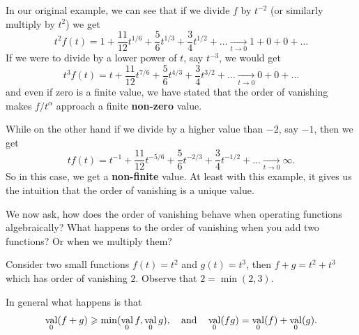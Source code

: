 \documentclass[12pt]{memoir}
\DeclareMathOperator{\val}{val}
\begin{document}
\begin{Ex}
    In our original example, we can see that if we divide $f$ by $t^{-2}$ (or similarly multiply by $t^2$) we get 
$$t^2f(t) = 1 + \frac{11}{12}t^{1/6} + \frac{5}{6}t^{1/3} + \frac{3}{4}t^{1/2} + \dots \xrightarrow[t\to0]{} 1 + 0 + 0 + \dots$$
If we were to divide by a lower power of $t$, say $t^{-3}$, we would get 
$$t^3f(t) = t + \frac{11}{12}t^{7/6} + \frac{5}{6}t^{4/3} + \frac{3}{4}t^{3/2} + \dots \xrightarrow[t\to0]{} 0 + 0 + \dots$$
and even if zero is a finite value, we have stated that the order of vanishing makes $f/t^\alpha$ approach a finite \textbf{non-zero} value.\par 
While on the other hand if we divide by a higher value than $-2$, say $-1$, then we get 
$$tf(t) = t^{-1} + \frac{11}{12}t^{-5/6} + \frac{5}{6}t^{-2/3} + \frac{3}{4}t^{-1/2} + \dots \xrightarrow[t\to0]{} \infty.$$
So in this case, we get a \textbf{non-finite} value. At least with this example, it gives us the intuition that the order of vanishing is a unique value.

\end{Ex}

We now ask, how does the order of vanishing behave when operating functions algebraically? What happens to the order of vanishing when you add two functions? Or when we multiply them?

\begin{Ex}
    Consider two small functions $f(t)=t^2$ and $g(t)=t^3$, then $f+g=t^2+t^3$ which has order of vanishing $2$. Observe that $2=\min(2,3)$.
\end{Ex}

In general what happens is that
$$\val_0(f+g)\geq\min(\val_0 f,\val_0 g),\word{and}\val_0(fg)=\val_0(f)+\val_0(g).$$
\end{document}
